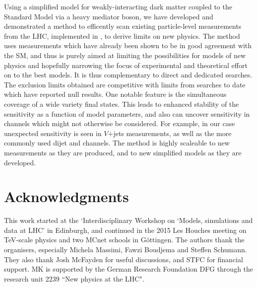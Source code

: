 \documentclass[floatfix]{article}
\begin{document}
Using a simplified model for weakly-interacting dark matter coupled to the Standard Model via a heavy mediator boson, we have developed and demonstrated 
a method to efficently scan existing particle-level measurements from the LHC, implemented in \rivet, to derive limits on new physics. 
The \Contur method uses measurements which have already been shown to be in good agreement with the SM, and thus is purely aimed at limiting the possibilities 
for models of new physics and hopefully narrowing the focus of experimental and theoretical effort on to the best models. It is thus complementary to 
direct and dedicated searches. The exclusion limits obtained are competitive with limits from searches to  date which have reported null results.
One notable feature is the simultaneous coverage of a wide variety final states. This leads to enhanced stability of the sensitivity as a function of model
parameters, and also can uncover sensitivity in channels which might not otherwise be considered. For example, in our case unexpected sensitivity is seen in
$V$+jets measurements, as well as the more commonly used dijet and \MET channels. The method is highly scaleable to new measurements as they are produced, and
to new simplified models as they are developed.

\section*{Acknowledgments}
This work started at the `Interdisciplinary Workshop on ‘Models, simulations and data at LHC' in Edinburgh, and continued in the 2015 Les Houches meeting on 
TeV-scale physics and two MCnet schools in G\"ottingen. The authors thank the organisers, especially Michela Massimi, Fawzi Boudjema and Steffen Schumann. 
They also thank Josh McFayden for useful discussions, and STFC for financial support. MK is supported by the German Research Foundation DFG through the research unit 2239 ``New physics at the LHC".



\end{document}
